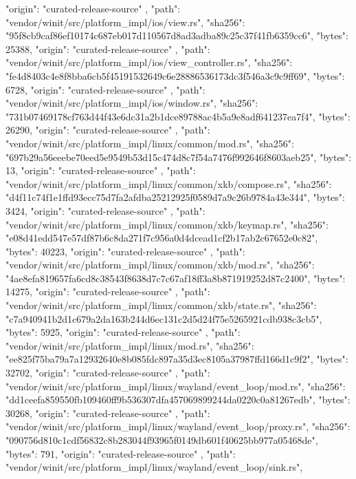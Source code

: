 {{      "origin": "curated-release-source"
    },
    {
      "path": "vendor/winit/src/platform_impl/ios/view.rs",
      "sha256": "95f8cb9caf86ef10174c687eb017d110567d8ad3adba89c25c37f41fb6359cc6",
      "bytes": 25388,
      "origin": "curated-release-source"
    },
    {
      "path": "vendor/winit/src/platform_impl/ios/view_controller.rs",
      "sha256": "fe4d8403c4e8f8bba6cb5f45191532649c6e28886536173dc3f546a3c9c9ff69",
      "bytes": 6728,
      "origin": "curated-release-source"
    },
    {
      "path": "vendor/winit/src/platform_impl/ios/window.rs",
      "sha256": "731b07469178cf763d44f43e6dc31a2b1dce89788ac4b5a9e8adf641237ea7f4",
      "bytes": 26290,
      "origin": "curated-release-source"
    },
    {
      "path": "vendor/winit/src/platform_impl/linux/common/mod.rs",
      "sha256": "697b29a56eeebe70eed5e9549b53d15c474d8c7f54a7476f992646f8603aeb25",
      "bytes": 13,
      "origin": "curated-release-source"
    },
    {
      "path": "vendor/winit/src/platform_impl/linux/common/xkb/compose.rs",
      "sha256": "d4f11c74f1e1ffd93ecc75d7fa2afdba25212925f0589d7a9c26b9784a43e344",
      "bytes": 3424,
      "origin": "curated-release-source"
    },
    {
      "path": "vendor/winit/src/platform_impl/linux/common/xkb/keymap.rs",
      "sha256": "e08d41edd547e57df87b6c8da271f7c956a0d4dcead1cf2b17ab2c67652e0c82",
      "bytes": 40223,
      "origin": "curated-release-source"
    },
    {
      "path": "vendor/winit/src/platform_impl/linux/common/xkb/mod.rs",
      "sha256": "4ae8efa819657fa6cd8c38543f8638d7c7c67af18ff3a8b871919252d87c2400",
      "bytes": 14275,
      "origin": "curated-release-source"
    },
    {
      "path": "vendor/winit/src/platform_impl/linux/common/xkb/state.rs",
      "sha256": "c7a940941b2d1c679a2da163b244d6ec131c2d5d24f75e5265921cdb938c3cb5",
      "bytes": 5925,
      "origin": "curated-release-source"
    },
    {
      "path": "vendor/winit/src/platform_impl/linux/mod.rs",
      "sha256": "ee825f75ba79a7a12932640e8b085fdc897a35d3ec8105a37987ffd166d1c9f2",
      "bytes": 32702,
      "origin": "curated-release-source"
    },
    {
      "path": "vendor/winit/src/platform_impl/linux/wayland/event_loop/mod.rs",
      "sha256": "dd1ceefa859550fb109460ff9b536307dfa457069899244da0220c0a81267edb",
      "bytes": 30268,
      "origin": "curated-release-source"
    },
    {
      "path": "vendor/winit/src/platform_impl/linux/wayland/event_loop/proxy.rs",
      "sha256": "090756d810c1cdf56832c8b283044f93965f0149db601f40625bb977a05468de",
      "bytes": 791,
      "origin": "curated-release-source"
    },
    {
      "path": "vendor/winit/src/platform_impl/linux/wayland/event_loop/sink.rs",
}}
